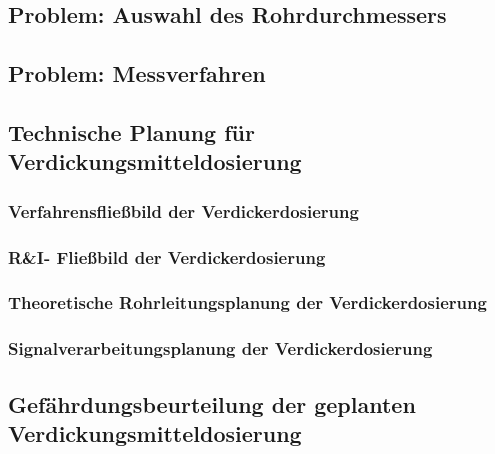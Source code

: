 \subsection{Problem: Auswahl des Rohrdurchmessers}


\subsection{Problem: Messverfahren}

\subsection{Technische Planung für Verdickungsmitteldosierung}
\subsubsection{Verfahrensfließbild der Verdickerdosierung}
\subsubsection{R\&I- Fließbild der Verdickerdosierung}
\subsubsection{Theoretische Rohrleitungsplanung der Verdickerdosierung}

\subsubsection{Signalverarbeitungsplanung der Verdickerdosierung}

\subsection{Gefährdungsbeurteilung der geplanten Verdickungsmitteldosierung}



